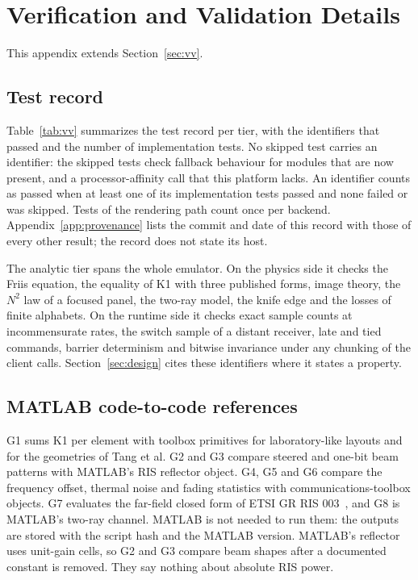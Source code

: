 \section{Verification and Validation Details}\label{app:vv}

This appendix extends Section~\ref{sec:vv}.

\subsection{Test record}

Table~\ref{tab:vv} summarizes the test record per tier, with the identifiers
that passed and the number of implementation tests. No skipped test carries an identifier: the skipped tests check fallback
behaviour for modules that are now present, and a processor-affinity call that this platform
lacks. An identifier counts as passed when at
least one of its implementation tests passed and none failed or was skipped. Tests of the
rendering path count once per backend. Appendix~\ref{app:provenance} lists the commit and
date of this record with those of every other result; the record does not state its host.

The analytic tier spans the whole emulator. On the physics side it checks the Friis
equation, the equality of K1 with three published forms, image theory, the $N^2$ law of a
focused panel, the two-ray model, the knife edge and the losses of finite alphabets. On the
runtime side it checks exact sample counts at incommensurate rates, the switch sample of a
distant receiver, late and tied commands, barrier determinism and bitwise invariance under
any chunking of the client calls. Section~\ref{sec:design} cites these identifiers where it
states a property.

\subsection{MATLAB code-to-code references}
G1 sums K1
per element with toolbox primitives for laboratory-like layouts and for the geometries of
Tang et al. G2 and G3 compare steered and one-bit beam patterns with MATLAB's RIS reflector
object. G4, G5 and G6 compare the frequency offset, thermal noise and fading statistics with
communications-toolbox objects. G7 evaluates the far-field closed form of ETSI GR RIS
003~\cite{ETSI_GR_RIS003_v121}, and G8 is MATLAB's two-ray channel. MATLAB is not needed to
run them: the outputs are stored with the script hash and the MATLAB version. MATLAB's
reflector uses unit-gain cells, so G2 and G3 compare beam shapes after a documented constant
is removed. They say nothing about absolute RIS power.

